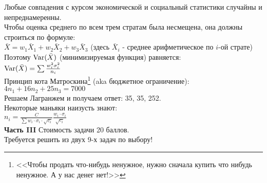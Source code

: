 \documentclass[pdftex,12pt,a4paper]{article}
\begin{document}
Любые совпадения с курсом экономической и социальный статистики случайны и непреднамеренны. \\
Чтобы оценка среднего по всем трем стратам была несмещена, она должны строиться по формуле: \\
$\bar{X}=w_{1}\bar{X}_{1}+w_{2}\bar{X}_{2}+w_{3}\bar{X}_{3}$ (здесь $\bar{X}_{i}$ - среднее арифметическое по $i$-ой страте) \\
Поэтому $\operatorname{Var}(\bar{X})$ (минимизируемая функция) равняется: \\
$\operatorname{Var}(\bar{X})=\sum \frac{w^{2}_{i}\sigma^{2}_{i}}{n_{i}}$ \\
Принцип кота Матроскина\footnote{<<Чтобы продать что-нибудь ненужное, нужно сначала купить что нибудь ненужное. А у нас денег нет!>>} (aka бюджетное ограничение):  $4n_{1}+16n_{2}+25n_{3}=7000$ \\
Решаем Лагранжем и получаем ответ: 35, 35, 252. \\
Некоторые маньяки наизусть знают: \\
$n_{i}=\frac{C}{\sum w_{i}\cdot \sigma_{i}\cdot\sqrt{c_{i}}}\frac{w_{i}\cdot \sigma_{i}}{\sqrt{c_{i}}}$\\






\textbf{Часть III} Стоимость задачи 20 баллов. \\

Требуется решить \textbf{} из двух 9-х задач по
выбору! \\
\end{document}

